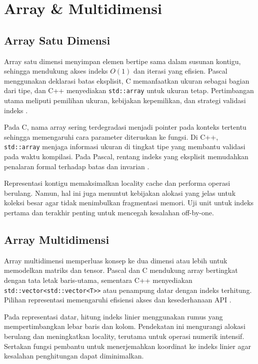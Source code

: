 \documentclass[../main.tex]{subfiles}
\begin{document}
\chapter{Array \& Multidimensi}
\section{Array Satu Dimensi}
Array satu dimensi menyimpan elemen bertipe sama dalam susunan kontigu, sehingga mendukung akses indeks \(O(1)\) dan iterasi yang efisien. Pascal menggunakan deklarasi batas eksplisit, C memanfaatkan ukuran sebagai bagian dari tipe, dan C++ menyediakan \texttt{std::array} untuk ukuran tetap. Pertimbangan utama meliputi pemilihan ukuran, kebijakan kepemilikan, dan strategi validasi indeks \parencite{pascal-tutorial-wikibooks,iso-c-draft-n1570,cpp-reference}.

Pada C, nama array sering terdegradasi menjadi pointer pada konteks tertentu sehingga memengaruhi cara parameter diteruskan ke fungsi. Di C++, \texttt{std::array} menjaga informasi ukuran di tingkat tipe yang membantu validasi pada waktu kompilasi. Pada Pascal, rentang indeks yang eksplisit memudahkan penalaran formal terhadap batas dan invarian \parencite{free-pascal-docs}.

Representasi kontigu memaksimalkan locality cache dan performa operasi berulang. Namun, hal ini juga menuntut kebijakan alokasi yang jelas untuk koleksi besar agar tidak menimbulkan fragmentasi memori. Uji unit untuk indeks pertama dan terakhir penting untuk mencegah kesalahan off-by-one.

\section{Array Multidimensi}
Array multidimensi memperluas konsep ke dua dimensi atau lebih untuk memodelkan matriks dan tensor. Pascal dan C mendukung array bertingkat dengan tata letak baris-utama, sementara C++ menyediakan \texttt{std::vector<std::vector<T>>} atau penampung datar dengan indeks terhitung. Pilihan representasi memengaruhi efisiensi akses dan kesederhanaan API \parencite{iso-c-draft-n1570,cpp-reference}.

Pada representasi datar, hitung indeks linier menggunakan rumus yang mempertimbangkan lebar baris dan kolom. Pendekatan ini mengurangi alokasi berulang dan meningkatkan locality, terutama untuk operasi numerik intensif. Sertakan fungsi pembantu untuk menerjemahkan koordinat ke indeks linier agar kesalahan penghitungan dapat diminimalkan.
\end{document}
